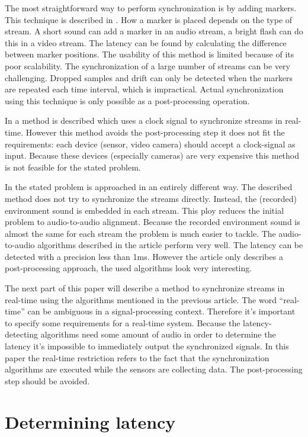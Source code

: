 \documentclass[twocolumn]{phdsymp} %
\begin{document}
The most straightforward way to perform synchronization is by adding markers. This technique is described in \cite{bannach2009automatic}. How a marker is placed depends on the type of stream. A short sound can add a marker in an audio stream, a bright flash can do this in a video stream. The latency can be found by calculating the difference between marker positions. The usability of this method is limited because of its poor scalability. The synchronization of a large number of streams can be very challenging. Dropped samples and drift can only be detected when the markers are repeated each time interval, which is impractical. Actual synchronization using this technique is only possible as a post-processing operation.

In \cite{jaimovich2010synchronization} a method is described which uses a clock signal to synchronize streams in real-time. However this method avoids the post-processing step it does not fit the requirements: each device (sensor, video camera) should accept a clock-signal as input. Because these devices (especially cameras) are very expensive this method is not feasible for the stated problem.

In \cite{six2015multimodal} the stated problem is approached in an entirely different way. The described method does not try to synchronize the streams directly. Instead, the (recorded) environment sound is embedded in each stream. This ploy reduces the initial problem to audio-to-audio alignment. Because the recorded environment sound is almost the same for each stream the problem is much easier to tackle. The audio-to-audio algorithms described in the article perform very well. The latency can be detected with a precision less than 1ms. However the article only describes a post-processing approach, the used algorithms look very interesting.

The next part of this paper will describe a method to synchronize streams in real-time using the algorithms mentioned in the previous article. The word ``real-time'' can be ambiguous in a signal-processing context. Therefore it's important to specify some requirements for a real-time system. Because the latency-detecting algorithms need some amount of audio in order to determine the latency it's impossible to immediately output the synchronized signals. In this paper the real-time restriction refers to the fact that the synchronization algorithms are executed while the sensors are collecting data. The post-processing step should be avoided.

\section{Determining latency}
\end{document}
